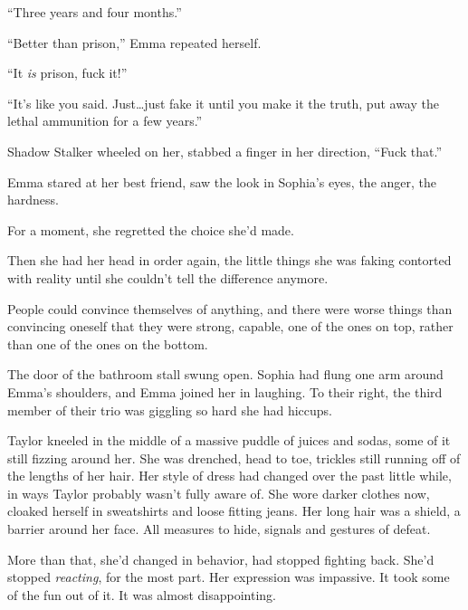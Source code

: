 ``Three years and four months.''



``Better than prison,'' Emma repeated herself.



``It \emph{is} prison, fuck it!''



``It's like you said.  Just\ldots just fake it until you make it the truth, put away the lethal ammunition for a few years.''



Shadow Stalker wheeled on her, stabbed a finger in her direction, ``Fuck that.''



Emma stared at her best friend, saw the look in Sophia's eyes, the anger, the hardness.



For a moment, she regretted the choice she'd made.



Then she had her head in order again, the little things she was faking contorted with reality until she couldn't tell the difference anymore.



People could convince themselves of anything, and there were worse things than convincing oneself that they were strong, capable, one of the ones on top, rather than one of the ones on the bottom.



\sectionbreak



The door of the bathroom stall swung open.  Sophia had flung one arm around Emma's shoulders, and Emma joined her in laughing.  To their right, the third member of their trio was giggling so hard she had hiccups.



Taylor kneeled in the middle of a massive puddle of juices and sodas, some of it still fizzing around her.  She was drenched, head to toe, trickles still running off of the lengths of her hair.  Her style of dress had changed over the past little while, in ways Taylor probably wasn't fully aware of.  She wore darker clothes now, cloaked herself in sweatshirts and loose fitting jeans.  Her long hair was a shield, a barrier around her face.  All measures to hide, signals and gestures of defeat.



More than that, she'd changed in behavior, had stopped fighting back. She'd stopped \emph{reacting}, for the most part.  Her expression was impassive.  It took some of the fun out of it.  It was almost disappointing.



